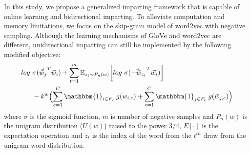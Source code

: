 \documentclass[11pt,a4paper]{article}
\newcommand{\indicator}{\ensuremath{\mathbbm{1}}}
\begin{document}
In this study, we propose a generalized imparting framework that is capable of online learning and bidirectional imparting. To alleviate computation and memory limitations, we focus on the skip-gram model of word2vec with negative sampling.
Although the learning mechanisms of GloVe and word2vec are different, unidirectional imparting can still be implemented by the following modified objective:
\begin{align}
\begin{split}
log ~ & \sigma ({\vec{\tilde{w}}_{j}}^T \vec{w}_{i}) + \sum_{t = 1}^{m} {\mathbb{E}}_{z_t \sim P_n(w)} \bigg[ log ~ \sigma({\vec{-\tilde{w}}_{z_t}}^T \vec{w}_{i}) \bigg] \\ 
& -k^w \Bigl(  \sum_{c=1}^{C} \indicator_{i\in{}F_c} \: g(w_{i,c}) + \sum_{c=1}^{C} \indicator_{j \in F_c} \: g(\tilde{w}_{j,c}) \Bigr)
\end{split}
\label{eq:word2vec_uni}
\end{align}
where $\sigma$ is the sigmoid function, $m$ is number of negative samples and $P_n(w)$ is the unigram distribution ($U(w)$) raised to the power 3/4, $E[\cdot]$ is the expectation operation and $z_t$ is the index of the word from the $t^{th}$ draw from the unigram word distribution.
\end{document}
